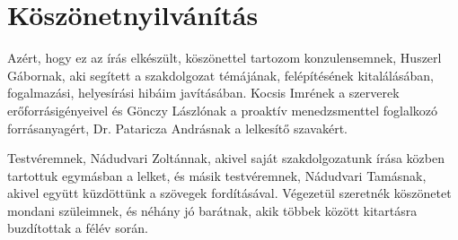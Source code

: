 \chapter*{Köszönetnyilvánítás}

Azért, hogy ez az írás elkészült, köszönettel tartozom konzulensemnek, Huszerl Gábornak, aki segített a szakdolgozat témájának, felépítésének kitalálásában, fogalmazási, helyesírási hibáim javításában. Kocsis Imrének a szerverek erőforrásigényeivel és Gönczy Lászlónak a proaktív menedzsmenttel foglalkozó forrásanyagért, Dr. Pataricza Andrásnak a lelkesítő szavakért.

Testvéremnek, Nádudvari Zoltánnak, akivel saját szakdolgozatunk írása közben tartottuk egymásban a lelket, és másik testvéremnek, Nádudvari Tamásnak, akivel együtt küzdöttünk a szövegek fordításával. Végezetül szeretnék köszönetet mondani szüleimnek, és néhány jó barátnak, akik többek között kitartásra buzdítottak a félév során.
